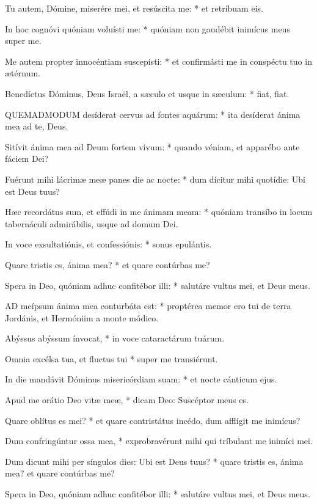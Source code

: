 Tu autem, Dómine, miserére mei, et resúscita me: * et retríbuam eis.

In hoc cognóvi quóniam voluísti me: * quóniam non gaudébit inimícus meus super me.

Me autem propter innocéntiam suscepísti: * et confirmásti me in conspéctu tuo in ætérnum.

Benedíctus Dóminus, Deus Israël, a sæculo et usque in sæculum: * fiat, fiat.


\lettrine[lines=2]{Q}{UEMADMODUM} desíderat cervus ad fontes aquárum: * ita desíderat ánima mea ad te, Deus.

Sitívit ánima mea ad Deum fortem vivum: * quando véniam, et apparébo ante fáciem Dei?

Fuérunt mihi lácrimæ meæ panes die ac nocte: * dum dícitur mihi quotídie: Ubi est Deus tuus?

Hæc recordátus sum, et effúdi in me ánimam meam: * quóniam transíbo in locum tabernáculi admirábilis, usque ad domum Dei.

In voce exsultatiónis, et confessiónis: * sonus epulántis.

Quare tristis es, ánima mea? * et quare contúrbas me?

Spera in Deo, quóniam adhuc confitébor illi: * salutáre vultus mei, et Deus meus.


\lettrine[lines=2]{A}{D} meípsum ánima mea conturbáta est: * proptérea memor ero tui de terra Jordánis, et Hermóniim a monte módico.

Abýssus abýssum ínvocat, * in voce cataractárum tuárum.

Omnia excélsa tua, et fluctus tui * super me transiérunt.

In die mandávit Dóminus misericórdiam suam: * et nocte cánticum ejus.

Apud me orátio Deo vitæ meæ, * dicam Deo: Suscéptor meus es.

Quare oblítus es mei? * et quare contristátus incédo, dum afflígit me inimícus?

Dum confringúntur ossa mea, * exprobravérunt mihi qui tríbulant me inimíci mei.

Dum dicunt mihi per síngulos dies: Ubi est Deus tuus? * quare tristis es, ánima mea? et quare contúrbas me?

Spera in Deo, quóniam adhuc confitébor illi: * salutáre vultus mei, et Deus meus.

